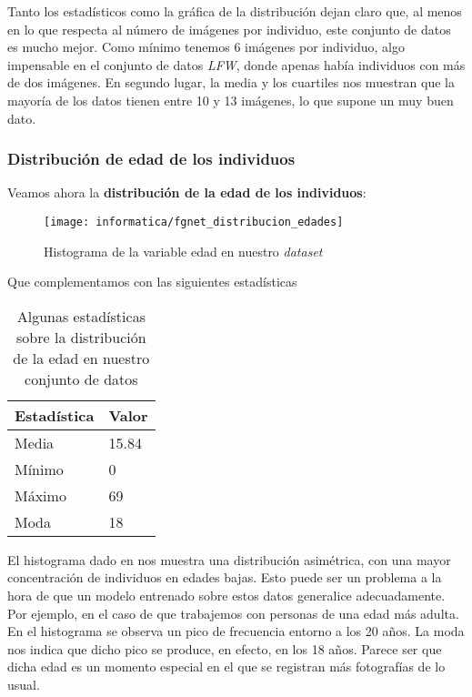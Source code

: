 Tanto los estadísticos como la gráfica de la distribución dejan claro que, al menos en lo que respecta al número de imágenes por individuo, este conjunto de datos es mucho mejor. Como mínimo tenemos 6 imágenes por individuo, algo impensable en el conjunto de datos \textit{LFW}, donde apenas había individuos con más de dos imágenes. En segundo lugar, la media y los cuartiles nos muestran que la mayoría de los datos tienen entre 10 y 13 imágenes, lo que supone un muy buen dato.

\subsubsection{Distribución de edad de los individuos} \label{isubsubs:fgnet_dist_edades}

Veamos ahora la \textbf{distribución de la edad de los individuos}:

\begin{figure}[H]
    \centering
    \texttt{[image: informatica/fgnet\_distribucion\_edades]}
    \caption{Histograma de la variable edad en nuestro \textit{dataset}}
    \label{img:fgnet_histograma_edad}
\end{figure}

Que complementamos con las siguientes estadísticas

\begin{table}[H]
\centering
\begin{tabular}{|l|l|}
    \hline
    \textbf{Estadística} & \textbf{Valor} \\
    \hline

    Media  & 15.84 \\
    Mínimo & 0 \\
    Máximo & 69 \\
    Moda   & 18 \\

    \hline

\end{tabular}

    \caption{Algunas estadísticas sobre la distribución de la edad en nuestro conjunto de datos}
    \label{table:fgnet_estadisticas_edad}
\end{table}

El histograma dado en  nos muestra una distribución asimétrica, con una mayor concentración de individuos en edades bajas. Esto puede ser un problema a la hora de que un modelo entrenado sobre estos datos generalice adecuadamente. Por ejemplo, en el caso de que trabajemos con personas de una edad más adulta. En el histograma se observa un pico de frecuencia entorno a los 20 años. La moda nos indica que dicho pico se produce, en efecto, en los 18 años. Parece ser que dicha edad es un momento especial en el que se registran más fotografías de lo usual.

